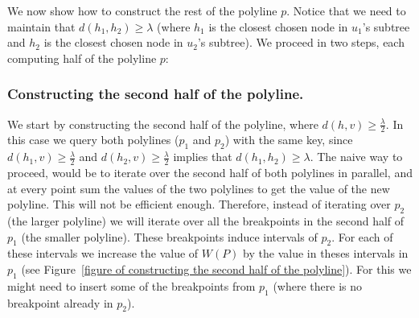 \documentclass[11pt,a4paper]{article}
\theoremstyle{definition}
\theoremstyle{remark}
\begin{document}
We now show how to construct the rest of the polyline $p$. Notice that we need to maintain that $d(h_1,h_2) \geq \lambda$ (where $h_1$ is the closest chosen node in $u_1$'s subtree and $h_2$ is the closest chosen node in $u_2$'s subtree). We proceed in two steps, each computing half of the polyline $p$:

\subsubsection{Constructing the second half of the polyline.} We start by constructing the second half of the polyline, where $d(h,v) \geq \frac{\lambda}{2}$. In this case we query both polylines ($p_1$ and $p_2$) with the same key, since $d(h_1,v) \geq \frac{\lambda}{2}$ and $d(h_2,v) \geq \frac{\lambda}{2}$ implies that $d(h_1,h_2) \geq \lambda$. The naive way to proceed, would be to iterate over the second half of both polylines in parallel, and at every point sum the values of the two polylines to get the value of the new polyline. This will not be efficient enough. Therefore, instead of iterating over $p_2$ (the larger polyline) we will iterate over all the breakpoints in the second half of $p_1$ (the smaller polyline). These breakpoints induce intervals of $p_2$. For each of these intervals we increase the value of $W(P)$ by the value in theses intervals in $p_1$ (see Figure~\ref{figure of constructing the second half of the polyline}). For this we might need to insert some of the breakpoints from $p_1$ (where there is no breakpoint already in $p_2$). %
\end{document}
